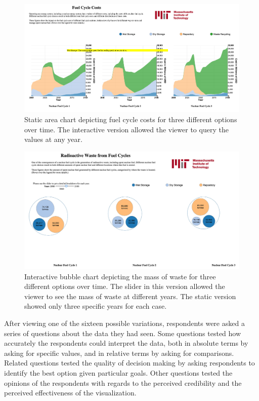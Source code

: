 \begin{figure}[htbp]
  \centering
  \includegraphics[width=\columnwidth]{./images/viz-area-static-cost}
  \caption{Static area chart depicting fuel cycle costs for three different
    options over time.  The interactive version allowed the viewer to query the
    values at any year.}
  \label{fig:viz-area-static-cost}
\end{figure}

\begin{figure}[htbp]
  \centering
  \includegraphics[width=\columnwidth]{./images/viz-bubble-dynamic-waste}
  \caption{Interactive bubble chart depicting the mass of waste for three
    different options over time.  The slider in this version allowed the viewer
    to see the mass of waste at different years.  The static version showed
    only three specific years for each case.}
  \label{fig:viz-bubble-dynamic-waste}
\end{figure}

After viewing one of the sixteen possible variations, respondents were asked a
series of questions about the data they had seen.  Some questions tested how
accurately the respondents could interpret the data, both in absolute terms by
asking for specific values, and in relative terms by asking for comparisons.
Related questions tested the quality of decision making by asking respondents
to identify the best option given particular goals.  Other questions tested
the opinions of the respondents with regards to the perceived credibility and
the perceived effectiveness of the visualization.

